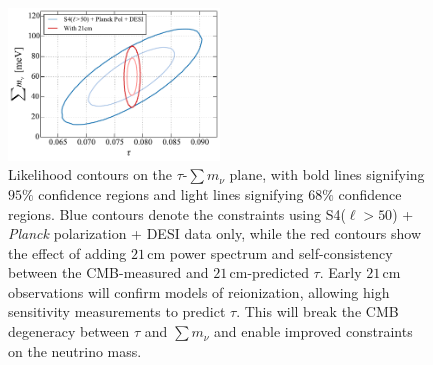 \documentclass[twocolumn,aps,prd,nofootinbib,showpacs,superscriptaddress]{revtex4-1}
\begin{document}
\begin{figure}[!]
\centering
\includegraphics[width=0.5\textwidth]{figures/SumnuTau_w21cm.pdf}
\caption{Likelihood contours on the $\tau$-$\sum m_\nu$ plane, with bold lines signifying $95\%$ confidence regions and light lines signifying $68\%$ confidence regions. Blue contours denote the constraints using S4($\ell > 50$) + \emph{Planck} polarization + DESI data only, while the red contours show the effect of adding $21\,\textrm{cm}$ power spectrum and self-consistency between the CMB-measured and $21\,\textrm{cm}$-predicted $\tau$. Early $21\,\textrm{cm}$ observations will confirm models of reionization, allowing high sensitivity measurements to predict $\tau$. This will break the CMB degeneracy between $\tau$ and $\sum m_\nu$ and enable improved constraints on the neutrino mass.}
\label{fig:SumnuTau_w21cm}
\end{figure}
\end{document}

